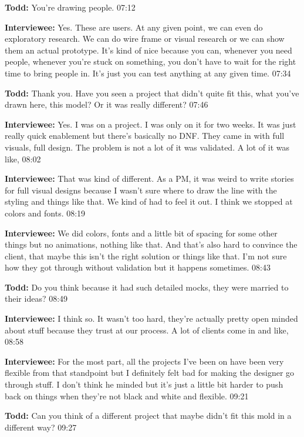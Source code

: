 \textbf{Todd:} You're drawing people. 07:12

\textbf{Interviewee:} Yes. These are users. At any given point, we can even do exploratory research. We can do wire frame or visual research or we can show them an actual prototype. 	It's kind of nice because you can, whenever you need people, whenever you're stuck on something, you don't have to wait for the right time to bring people in. 	It's just you can test anything at any given time.  07:34

\textbf{Todd:} Thank you. Have you seen a project that didn't quite fit this, what you've drawn here, this model? Or it was really different? 07:46

\textbf{Interviewee:} Yes. I was on a project. I was only on it for two weeks. It was just really quick enablement but there's basically no DNF. They came in with full visuals, full design. The problem is not a lot of it was validated. A lot of it was like,  08:02

\textbf{Interviewee:} That was kind of different. As a PM, it was weird to write stories for full visual designs because I wasn't sure where to draw the line with the styling and things like that. We kind of had to feel it out. I think we stopped at colors and 	fonts. 	08:19

\textbf{Interviewee:} We did colors, fonts and a little bit of spacing for some other things but no animations, nothing like that. And that's also hard to convince the client, that maybe this isn't the right solution or things like that. I'm not sure how they got 	through without validation but it happens sometimes. 08:43

\textbf{Todd:} Do you think because it had such detailed mocks, they were married to their ideas? 08:49

\textbf{Interviewee:} I think so. It wasn't too hard, they're actually pretty open minded about stuff because they trust at our process. A lot of clients come in and like,  08:58

\textbf{Interviewee:} For the most part, all the projects I've been on have been very flexible from that standpoint but I definitely felt bad for making the designer go through stuff. I don't think he minded but it's just a little bit harder to push back on things when they're not black and white and flexible. 09:21

\textbf{Todd:} Can you think of a different project that maybe didn't fit this mold in a different way? 09:27

